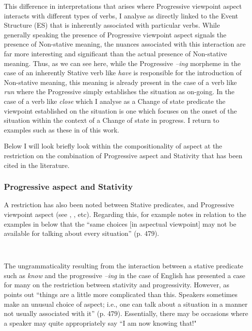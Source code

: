 This difference in interpretations that arises where Progressive viewpoint
aspect interacts with different types of verbs, I analyse as directly linked to
the Event Structure (ES) that is inherently associated with particular verbs.
While generally speaking the presence of Progressive viewpoint aspect signals
the presence of Non-stative meaning, the nuances associated with this
interaction are far more interesting and significant than the actual presence of
Non-stative meaning. Thus, as we can see here, while the Progressive
\textit{–ing} morpheme in the case of an inherently Stative verb like \textit{have} is
responsible for the introduction of Non-stative meaning, this meaning is already
present in the case of a verb like \textit{run} where the Progressive simply
establishes the situation as on-going. In the case of a verb like \textit{close} which
I analyse as a Change of state predicate \citep[cf.][]{Pustejovsky1988} the
viewpoint established on the situation is one which focuses on the onset of the
situation within the context of a Change of state in progress. I return to
examples such as these in  of this work.

Below I will look briefly look within the compositionality of aspect at the
restriction on the combination of Progressive aspect and Stativity that has been
cited in the literature.

\subsubsection{Progressive aspect and Stativity}\label{sec:1.1.1.2}

A restriction has also been noted between Stative predicates, and Progressive
viewpoint aspect (see \citealt{Vendler1957}, \citealt{Dowty1979},
\citealt{Smith1983} etc). Regarding this, \citet{Smith1983} for example notes in
relation to the examples in  below that the ``same choices [in
aspectual viewpoint] may not be available for talking about every situation'' (p.
479).

\ea\label{ex:1:5}~\citep[479]{Smith1983}
  \z
\z

The ungrammaticality resulting from the interaction between a stative predicate
such as \textit{know} and the progressive \textit{–ing} in the case of English has
presented a case for many on the restriction between stativity and
progressivity. However, as \citet{Smith1983} points out ``things are a little
more complicated than this. Speakers sometimes make an unusual choice of aspect;
i.e., one can talk about a situation in a manner not usually associated with
it'' (p. 479). Essentially, there may be occasions where a speaker may quite
appropriately say ``I am now knowing that!"

